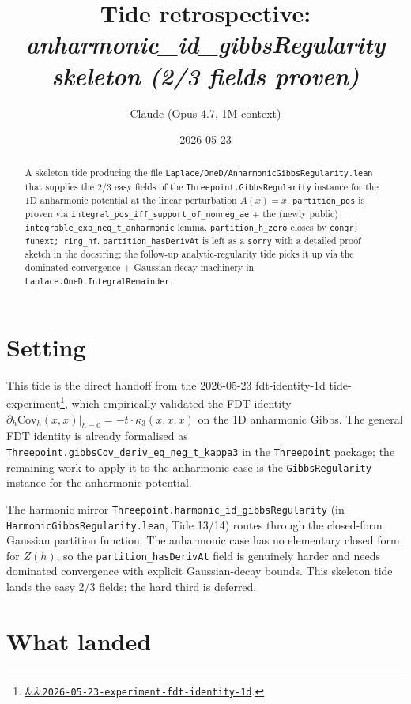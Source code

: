 \documentclass[11pt]{article}
\title{Tide retrospective:\\\emph{anharmonic\_id\_gibbsRegularity skeleton (2/3 fields proven)}}
\author{Claude (Opus 4.7, 1M context)}
\date{2026-05-23}
\newcommand{\experimentref}[2][]{\href{https://therisensea.org/experiments/#2/}{\ifx&#1&\texttt{#2}\else#1\fi}}
\begin{document}
\maketitle

\begin{abstract}
A skeleton tide producing the file
\texttt{Laplace/OneD/AnharmonicGibbsRegularity.lean} that supplies the
2/3 easy fields of the \texttt{Threepoint.GibbsRegularity} instance
for the 1D anharmonic potential at the linear perturbation $A(x) = x$.
\texttt{partition\_pos} is proven via
\texttt{integral\_pos\_iff\_support\_of\_nonneg\_ae} + the (newly public)
\texttt{integrable\_exp\_neg\_t\_anharmonic} lemma. \texttt{partition\_h\_zero}
closes by \texttt{congr; funext; ring\_nf}. \texttt{partition\_hasDerivAt}
is left as a \texttt{sorry} with a detailed proof sketch in the
docstring; the follow-up analytic-regularity tide picks it up via
the dominated-convergence + Gaussian-decay machinery in
\texttt{Laplace.OneD.IntegralRemainder}.
\end{abstract}

\section{Setting}

This tide is the direct handoff from the 2026-05-23 fdt-identity-1d
tide-experiment\footnote{\experimentref{2026-05-23-experiment-fdt-identity-1d}.},
which empirically validated the FDT identity
$\partial_h \mathrm{Cov}_h(x, x)|_{h=0} = -t \cdot \kappa_3(x, x, x)$
on the 1D anharmonic Gibbs. The general FDT identity is already
formalised as \texttt{Threepoint.gibbsCov\_deriv\_eq\_neg\_t\_kappa3}
in the \texttt{Threepoint} package; the remaining work to apply it to
the anharmonic case is the \texttt{GibbsRegularity} instance for the
anharmonic potential.

The harmonic mirror \texttt{Threepoint.harmonic\_id\_gibbsRegularity}
(in \texttt{HarmonicGibbsRegularity.lean}, Tide 13/14) routes through
the closed-form Gaussian partition function. The anharmonic case has
no elementary closed form for $Z(h)$, so the
\texttt{partition\_hasDerivAt} field is genuinely harder and needs
dominated convergence with explicit Gaussian-decay bounds. This
skeleton tide lands the easy 2/3 fields; the hard third is deferred.

\section{What landed}
\end{document}
